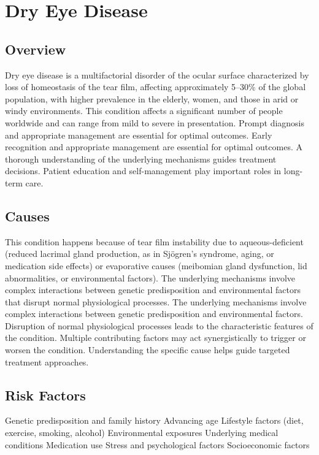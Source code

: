 \chapter{Dry Eye Disease}
\label{sec:Dry Eye Disease}

\section{Overview}
Dry eye disease is a multifactorial disorder of the ocular surface characterized by loss of homeostasis of the tear film, affecting approximately 5--30\% of the global population, with higher prevalence in the elderly, women, and those in arid or windy environments. This condition affects a significant number of people worldwide and can range from mild to severe in presentation. Prompt diagnosis and appropriate management are essential for optimal outcomes. Early recognition and appropriate management are essential for optimal outcomes. A thorough understanding of the underlying mechanisms guides treatment decisions. Patient education and self-management play important roles in long-term care.
\section{Causes}
This condition happens because of tear film instability due to aqueous-deficient (reduced lacrimal gland production, as in Sj\"{o}gren's syndrome, aging, or medication side effects) or evaporative causes (meibomian gland dysfunction, lid abnormalities, or environmental factors). The underlying mechanisms involve complex interactions between genetic predisposition and environmental factors that disrupt normal physiological processes. The underlying mechanisms involve complex interactions between genetic predisposition and environmental factors. Disruption of normal physiological processes leads to the characteristic features of the condition. Multiple contributing factors may act synergistically to trigger or worsen the condition. Understanding the specific cause helps guide targeted treatment approaches.
\section{Risk Factors}
Genetic predisposition and family history Advancing age Lifestyle factors (diet, exercise, smoking, alcohol) Environmental exposures Underlying medical conditions Medication use Stress and psychological factors Socioeconomic factors

